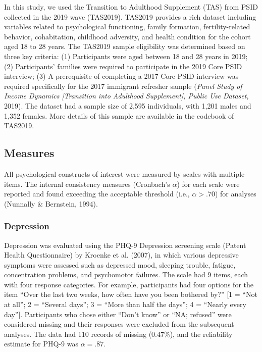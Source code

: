 \documentclass[
  man]{apa7}
\begin{document}
In this study, we used the Transition to Adulthood Supplement (TAS) from PSID collected in the 2019 wave (TAS2019). TAS2019 provides a rich dataset including variables related to psychological functioning, family formation, fertility-related behavior, cohabitation, childhood adversity, and health condition for the cohort aged 18 to 28 years. The TAS2019 sample eligibility was determined based on three key criteria: (1) Participants were aged between 18 and 28 years in 2019; (2) Participants' families were required to participate in the 2019 Core PSID interview; (3) A prerequisite of completing a 2017 Core PSID interview was required specifically for the 2017 immigrant refresher sample (\emph{Panel {Study} of {Income Dynamics} {[}{Transition} into {Adulthood Supplement}{]}, Public Use Dataset}, 2019). The dataset had a sample size of 2,595 individuals, with 1,201 males and 1,352 females. More details of this sample are available in the codebook of TAS2019.

\hypertarget{measures}{%
\subsection{Measures}\label{measures}}

All psychological constructs of interest were measured by scales with multiple items. The internal consistency measures (Cronbach's \(\alpha\)) for each scale were reported and found exceeding the acceptable threshold (i.e., \(\alpha > .70\)) for analyses (Nunnally \& Bernstein, 1994).

\hypertarget{depression}{%
\subsubsection{Depression}\label{depression}}

Depression was evaluated using the PHQ-9 Depression screening scale (Patent Health Questionnaire) by Kroenke et al. (2007), in which various depressive symptoms were assessed such as depressed mood, sleeping trouble, fatigue, concentration problems, and psychomotor failures. The scale had 9 items, each with four response categories. For example, participants had four options for the item ``Over the last two weeks, how often have you been bothered by?'' {[}1 = ``Not at all''; 2 = ``Several days''; 3 = ``More than half the days''; 4 = ``Nearly every day''{]}. Participants who chose either ``Don't know'' or ``NA; refused'' were considered missing and their responses were excluded from the subsequent analyses. The data had 110 records of missing (0.47\%), and the reliability estimate for PHQ-9 was \(\alpha = .87\).
\end{document}
